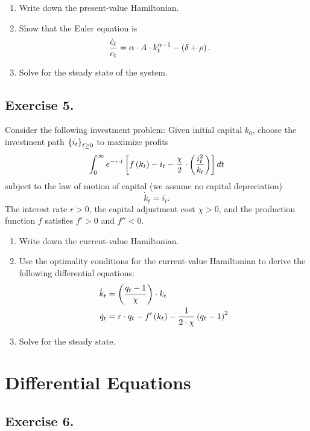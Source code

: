 \documentclass[letterpaper,12pt,leqno]{article}
\begin{document}
\begin{enumerate}
\item Write down the present-value Hamiltonian.
\item Show that the Euler equation is
\begin{align*}
\frac{\dot{c}_{t}}{c_{t}} &=\alpha \cdot  A \cdot k_{t}^{\alpha -1}-\left( \delta +\rho \right).
\end{align*}

\item Solve for the steady state of the system.
\end{enumerate}

\subsection*{Exercise 5.}

Consider the following investment problem: Given initial capital $k_{0}$, choose the investment path $\left\lbrace i_{t} \right\rbrace _{t \geq 0}$ to maximize profits
\begin{align*}
\int_{0}^{\infty} e^{-r\cdot t}\left[ f\left( k_{t} \right) -i_{t}-\frac{\chi}{2}\cdot \left( \frac{i_{t}^{2}}{k_{t}} \right) \right] dt 
\end{align*}
subject to the law of motion of capital (we assume no capital depreciation)
\[\dot{k}_{t} =i_{t}.\]
The interest rate $r>0$, the capital adjustment cost $\chi>0$, and the production function $f$ satisfies $f'>0$ and $f''<0$.

\begin{enumerate}
\item Write down the current-value Hamiltonian. 
\item Use the optimality conditions for the current-value Hamiltonian to derive the following differential equations:
\begin{align*}
\dot{k}_{t} &=\left( \frac{q_{t}-1}{\chi} \right)\cdot  k_{t} \\
\dot{q}_{t} &=r\cdot q_{t}-f'\left( k_{t} \right) -\frac{1}{2\cdot \chi}\left( q_{t}-1 \right)^{2}
\end{align*}

\item Solve for the steady state.
\end{enumerate}

\section*{Differential Equations}

\subsection*{Exercise 6.}
\end{document}
